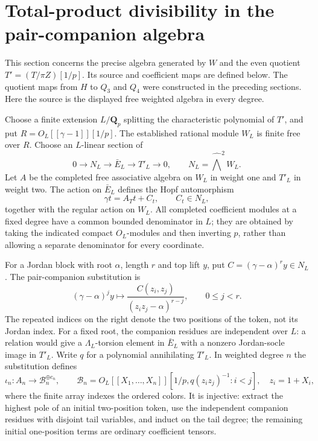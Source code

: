 \section{Total-product divisibility in the pair-companion algebra}
\label{sec:pair-total-saturation}

This section concerns the precise algebra generated by
$W$ and the even quotient $T'=(T/\pi Z)[1/p]$. Its
source and coefficient maps are defined below. The quotient maps from $H$ to $Q_3$ and $Q_4$ were
constructed in the preceding sections. Here the source
is the displayed free weighted algebra in every degree.

Choose a finite extension $L/\mathbf Q_p$ splitting
the characteristic polynomial of $T'$, and put
$R=O_L[[\gamma-1]][1/p]$. The established rational
module $W_L$ is finite free over $R$. Choose an
$L$-linear section of
\[
 0\longrightarrow N_L\longrightarrow\bar E_L
                  \longrightarrow T'_L\longrightarrow0,
 \qquad N_L=\widehat\bigwedge^2W_L.
\]
Let $A$ be the completed free associative algebra on
$W_L$ in weight one and $T'_L$ in weight two. The
action on $\bar E_L$ defines the Hopf
automorphism
\[
        \gamma t=A_Tt+C_t,\qquad C_t\in N_L,
\]
together with the regular action on $W_L$. All
completed coefficient modules at a fixed degree have
a common bounded denominator in $L$; they are obtained
by taking the indicated compact $O_L$-modules and then
inverting $p$, rather than allowing a separate
denominator for every coordinate.

For a Jordan block with root $\alpha$, length $r$ and
top lift $y$, put $C=(\gamma-\alpha)^ry\in N_L$.
The pair-companion substitution is
\[
 (\gamma-\alpha)^jy\longmapsto
       \frac{C(z_i,z_j)}{(z_iz_j-\alpha)^{r-j}},
                         \qquad0\leq j<r.
\]
The repeated indices on the right denote the two
positions of the token, not its Jordan index.
For a fixed root, the companion residues are
independent over $L$: a relation would give a
$\Lambda_L$-torsion element in $\bar E_L$ with a
nonzero Jordan-socle image in $T'_L$.
Write $q$ for a polynomial annihilating $T'_L$.
In weighted degree $n$ the substitution defines
\[
 \iota_n:A_n\longrightarrow\mathcal B_n^{\oplus c_n},
 \qquad
 \mathcal B_n=O_L[[X_1,\ldots,X_n]][1/p,
                      q(z_iz_j)^{-1}:i<j],\quad z_i=1+X_i,
\]
where the finite array indexes the ordered colors.
It is injective: extract the highest pole of an
initial two-position token, use the independent
companion residues with disjoint tail variables, and
induct on the tail degree; the remaining initial
one-position terms are ordinary coefficient tensors.

